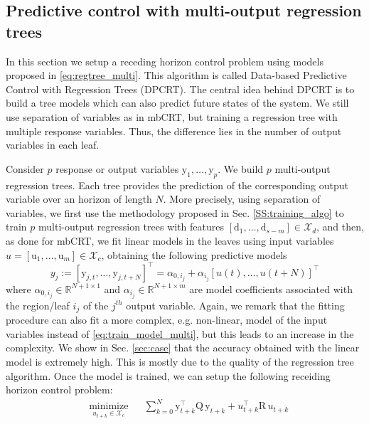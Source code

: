 \subsection{Predictive control with multi-output regression trees}
\label{SS:control_tree}
\textcolor[rgb]{1.00,0.00,0.00}{In this section we setup a receding horizon control problem using models proposed in \eqref{eq:regtree_multi}. This algorithm is called Data-based Predictive Control with Regression Trees (DPCRT). The central idea behind DPCRT is to build a tree models which can also predict future states of the system. We still use separation of variables as in mbCRT, but training a regression tree with multiple response variables. Thus, the difference lies in the number of output variables in each leaf.}

\textcolor[rgb]{0.00,0.00,1.00}{Consider $p$ response or output variables $\mathrm{y}_1,\ldots,\mathrm{y}_p$. We build $p$ multi-output regression trees. Each tree provides the prediction of the corresponding output variable over an horizon of length $N$. More precisely, using separation of variables, we first use the methodology proposed in Sec. \ref{SS:training_algo} to train $p$ multi-output regression trees with features $[\mathrm{d}_1,\ldots,\mathrm{d}_{s-m}]\in\mathcal{X}_d$, and then, as done for mbCRT, we fit linear models in the leaves using input variables $u=[\mathrm{u}_1,\ldots,\mathrm{u}_{m}]\in\mathcal{X}_c$, obtaining the following predictive models
\begin{equation}\label{eq:train_model_multi}
y_j := [\mathrm{y}_{j,t}, \ldots, \mathrm{y}_{j,t+N}]^\top = \alpha_{0,i_j} + \alpha_{i_j} [u(t),\ldots,u(t+N)]^\top
\end{equation}
where $\alpha_{0,i_j}\in\mathbb{R}^{N+1\times 1}$ and $\alpha_{i_j}\in\mathbb{R}^{N+1\times m}$ are model coefficients associated with the region/leaf $i_j$ of the $j^{th}$ output variable. Again, we remark that the fitting procedure can also fit a more complex, e.g. non-linear, model of the input variables instead of \eqref{eq:train_model_multi}, but this leads to an increase in the complexity. We show in Sec. \ref{sec:case} that the accuracy obtained with the linear model is extremely high. This is mostly due to the quality of the regression tree algorithm. Once the model is trained, we can setup the following receiding horizon control problem:
\begin{equation}\label{eq:DPCRT}
\begin{aligned}
& \underset{u_{t+k} \in \mathcal{X}_c}{\text{minimize}} & &  \sum_{k=0}^{N}{\mathrm{y}^\top_{t+k} \mathrm{Q}\, \mathrm{y}_{t+k} + u^\top_{t+k} \mathrm{R}\, u_{t+k}}  \\

\end{aligned}
\end{equation}}
